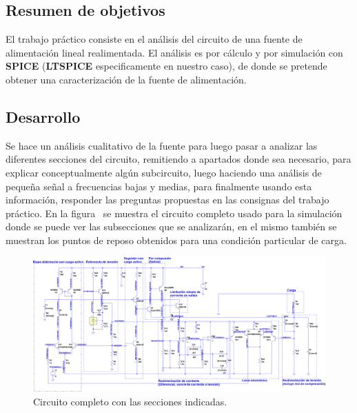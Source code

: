 
\subsection{Resumen de objetivos}


\normalfont

El trabajo práctico consiste en el análisis del circuito de una fuente de alimentación lineal realimentada. El análisis es por cálculo y por simulación con \textbf{SPICE} (\textbf{LTSPICE} especificamente en nuestro caso), de donde se pretende obtener una caracterización de la fuente de alimentación.


\subsection{Desarrollo}

Se hace un análisis cualitativo de la fuente para luego pasar a analizar las diferentes secciones del circuito, remitiendo a apartados donde sea necesario, para explicar conceptualmente algún subcircuito, luego haciendo una análisis de pequeña señal a frecuencias bajas y medias, para finalmente usando esta información, responder las preguntas propuestas en las consignas del trabajo práctico.
En la figura~ se muestra el circuito completo usado para la simulación donde se puede ver las subsecciones que se analizarán, en el mismo también se muestran los puntos de reposo obtenidos para una condición particular de carga.

\clearpage


\begin{figure}[H] %
\begin{center}
\includegraphics[width=1.2 \textwidth, angle=90]{./img/desarrollo/power_supply_subsections.png}
\caption{\label{fig:fig_complete_circuit_secions}\footnotesize{Circuito completo con las secciones indicadas.}}
\end{center}
\end{figure}

